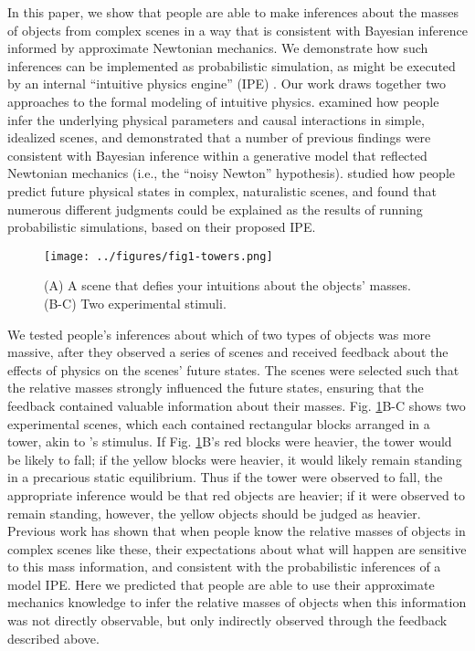 \documentclass[10pt,letterpaper]{article}
\begin{document}
In this paper, we show that people are able to make inferences about
the masses of objects from complex scenes in a way that is consistent
with Bayesian inference informed by approximate Newtonian mechanics.
We demonstrate how such inferences can be implemented as probabilistic
simulation, as might be executed by an internal ``intuitive physics
engine'' (IPE) \cite{Hamrick2011,Battaglia2013}. Our work draws
together two approaches to the formal modeling of intuitive physics.
 examined how people infer the underlying physical
parameters and causal interactions in simple, idealized scenes, and
demonstrated that a number of previous findings
\cite{Todd1982,Gilden1994} were consistent with Bayesian inference
within a generative model that reflected Newtonian mechanics (i.e.,
the ``noisy Newton'' hypothesis).   studied how
people predict future physical states in complex, naturalistic scenes,
and found that numerous different judgments could be explained as the
results of running probabilistic simulations, based on their proposed
IPE.


\begin{figure}[t]
  \begin{center}
    \texttt{[image: ../figures/fig1-towers.png]}
    \caption{\small (A) A scene that defies your intuitions about the
      objects' masses. (B-C) Two experimental stimuli.}
    \label{fig:1}
  \end{center}
\end{figure}

We tested people's inferences about which of two types of objects was
more massive, after they observed a series of scenes and received
feedback about the effects of physics on the scenes' future states.
The scenes were selected such that the relative masses strongly
influenced the future states, ensuring that the feedback contained
valuable information about their masses. Fig. \ref{fig:1}B-C shows two
experimental scenes, which each contained rectangular blocks arranged
in a tower, akin to 's stimulus. If Fig.
\ref{fig:1}B's red blocks were heavier, the tower would be likely to
fall; if the yellow blocks were heavier, it would likely remain
standing in a precarious static equilibrium. Thus if the tower were
observed to fall, the appropriate inference would be that red objects
are heavier; if it were observed to remain standing, however, the
yellow objects should be judged as heavier. Previous work has shown
that when people know the relative masses of objects in complex scenes
like these, their expectations about what will happen are sensitive to
this mass information, and consistent with the probabilistic
inferences of a model IPE. Here we predicted that people are able to
use their approximate mechanics knowledge to infer the relative masses
of objects when this information was not directly observable, but only
indirectly observed through the feedback described above.
\end{document}
